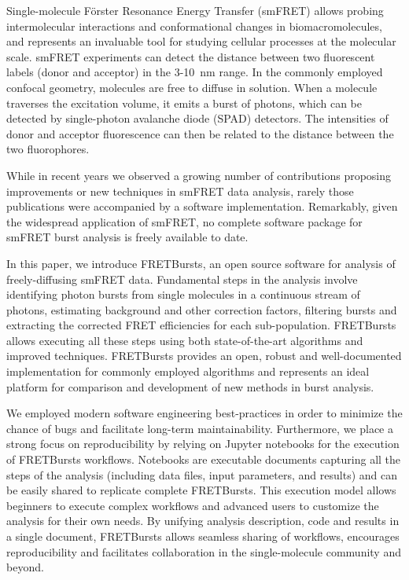 Single-molecule Förster Resonance Energy Transfer (smFRET) allows
probing intermolecular interactions and conformational changes in
biomacromolecules, and represents an invaluable tool for studying
cellular processes at the molecular scale. smFRET experiments can
detect the distance between two fluorescent labels (donor and acceptor)
in the 3-10~nm range. In the commonly employed confocal geometry,
molecules are free to diffuse in solution. When a molecule traverses
the excitation volume, it emits a burst of photons, which can be detected
by single-photon avalanche diode (SPAD) detectors. The intensities of
donor and acceptor fluorescence can then be related to the distance
between the two fluorophores.

While in recent years we observed a growing number of contributions
proposing improvements or new techniques in smFRET data analysis,
rarely those publications were accompanied by a software implementation.
Remarkably, given the widespread application of smFRET, no complete
software package for smFRET burst analysis is freely available to date.

In this paper, we introduce FRETBursts, an open source software
for analysis of freely-diffusing smFRET data.
Fundamental steps in the analysis involve identifying photon bursts
from single molecules in a continuous stream of photons, estimating
background and other correction factors, filtering bursts and extracting
the corrected FRET efficiencies for each sub-population.
FRETBursts allows executing all these steps using both state-of-the-art
algorithms and improved techniques.
FRETBursts provides an open, robust and well-documented
implementation for commonly employed algorithms and represents
an ideal platform for comparison and development of new methods
in burst analysis.

We employed modern software engineering best-practices in order to
minimize the chance of bugs and facilitate long-term maintainability.
Furthermore, we place a strong focus on reproducibility by relying on
Jupyter notebooks for the execution of FRETBursts workflows.
Notebooks are executable documents capturing all the steps of the
analysis (including data files, input parameters, and results) and can
be easily shared to replicate complete FRETBursts.
This execution model allows beginners to execute complex workflows
and advanced users to customize the analysis for their own needs.
By unifying analysis description, code and results in a single document, 
FRETBursts allows seamless sharing of workflows, encourages
reproducibility and facilitates collaboration in the 
single-molecule community and beyond.
